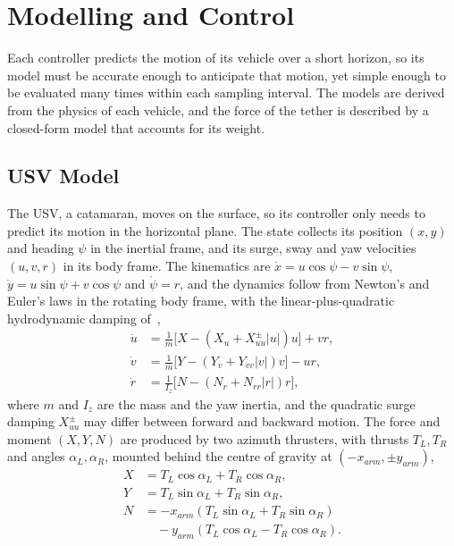 \section{Modelling and Control}
\label{sec:model}

Each controller predicts the motion of its vehicle over a short horizon, so its model must be accurate enough to anticipate that motion, yet simple enough to be evaluated many times within each sampling interval. The models are derived from the physics of each vehicle, and the force of the tether is described by a closed-form model that accounts for its weight.

\subsection{USV Model}

The USV, a catamaran, moves on the surface, so its controller only needs to predict its motion in the horizontal plane. The state collects its position $(x,y)$ and heading $\psi$ in the inertial frame, and its surge, sway and yaw velocities $(u,v,r)$ in its body frame. The kinematics are $\dot x = u\cos\psi - v\sin\psi$, $\dot y = u\sin\psi + v\cos\psi$ and $\dot\psi = r$, and the dynamics follow from Newton's and Euler's laws in the rotating body frame, with the linear-plus-quadratic hydrodynamic damping of~\cite{fossenHandbookMarineCraft2011},
\begin{equation}
\begin{aligned}
    \dot u &= \tfrac{1}{m}\big[X - (X_u + X_{uu}^{\pm}|u|)u\big] + vr, \\
    \dot v &= \tfrac{1}{m}\big[Y - (Y_v + Y_{vv}|v|)v\big] - ur, \\
    \dot r &= \tfrac{1}{I_z}\big[N - (N_r + N_{rr}|r|)r\big],
\end{aligned}
\label{eq:usv_dyn}
\end{equation}
where $m$ and $I_z$ are the mass and the yaw inertia, and the quadratic surge damping $X_{uu}^{\pm}$ may differ between forward and backward motion. The force and moment $(X,Y,N)$ are produced by two azimuth thrusters, with thrusts $T_L, T_R$ and angles $\alpha_L, \alpha_R$, mounted behind the centre of gravity at $(-x_{arm}, \pm y_{arm})$,
\begin{equation}
\begin{aligned}
    X &= T_L\cos\alpha_L + T_R\cos\alpha_R, \\
    Y &= T_L\sin\alpha_L + T_R\sin\alpha_R, \\
    N &= -x_{arm}(T_L\sin\alpha_L + T_R\sin\alpha_R) \\
      &\quad - y_{arm}(T_L\cos\alpha_L - T_R\cos\alpha_R).
\end{aligned}
\label{eq:usv_alloc}
\end{equation}

